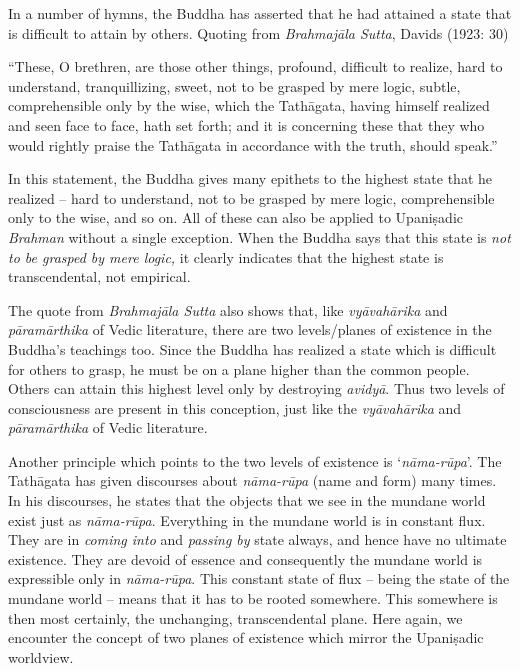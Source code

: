 In a number of hymns, the Buddha has asserted that he had attained a state that is difficult to attain by others. Quoting from \textit{Brahmajāla Sutta}, Davids (1923: 30)

\begin{myquote}
“These, O brethren, are those other things, profound, difficult to realize, hard to understand, tranquillizing, sweet, not to be grasped by mere logic, subtle, comprehensible only by the wise, which the Tathāgata, having himself realized and seen face to face, hath set forth; and it is concerning these that they who would rightly praise the Tathāgata in accordance with the truth, should speak.”
\end{myquote}

In this statement, the Buddha gives many epithets to the highest state that he realized – hard to understand, not to be grasped by mere logic, comprehensible only to the wise, and so on. All of these can also be applied to Upaniṣadic \textit{Brahman} without a single exception. When the Buddha says that this state is \textit{not to be grasped by mere logic,} it clearly indicates that the highest state is transcendental, not empirical.

The quote from \textit{Brahmajāla Sutta} also shows that, like \textit{vyāvahārika} and \textit{pāramārthika} of Vedic literature, there are two levels/planes of existence in the Buddha’s teachings too. Since the Buddha has realized a state which is difficult for others to grasp, he must be on a plane higher than the common people. Others can attain this highest level only by destroying \textit{avidyā}. Thus two levels of consciousness are present in this conception, just like the \textit{vyāvahārika} and \textit{pāramārthika} of Vedic literature.

Another principle which points to the two levels of existence is ‘\textit{nāma-rūpa}’. The Tathāgata has given discourses about \textit{nāma-rūpa} (name and form) many times. In his discourses, he states that the objects that we see in the mundane world exist just as \textit{nāma-rūpa}. Everything in the mundane world is in constant flux. They are in \textit{coming into} and \textit{passing by} state always, and hence have no ultimate existence. They are devoid of essence and consequently the mundane world is expressible only in \textit{nāma-rūpa}. This constant state of flux – being the state of the mundane world – means that it has to be rooted somewhere. This somewhere is then most certainly, the unchanging, transcendental plane. Here again, we encounter the concept of two planes of existence which mirror the Upaniṣadic worldview.


